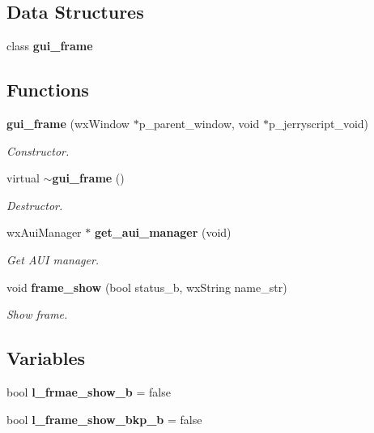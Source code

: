 \subsection*{Data Structures}
\begin{DoxyCompactItemize}
\item 
class \textbf{ gui\+\_\+frame}
\end{DoxyCompactItemize}
\subsection*{Functions}
\begin{DoxyCompactItemize}
\item 
\textbf{ gui\+\_\+frame} (wx\+Window $\ast$p\+\_\+parent\+\_\+window, void $\ast$p\+\_\+jerryscript\+\_\+void)
\begin{DoxyCompactList}\small\item\em Constructor. \end{DoxyCompactList}\item 
virtual \textbf{ $\sim$gui\+\_\+frame} ()
\begin{DoxyCompactList}\small\item\em Destructor. \end{DoxyCompactList}\item 
wx\+Aui\+Manager $\ast$ \textbf{ get\+\_\+aui\+\_\+manager} (void)
\begin{DoxyCompactList}\small\item\em Get A\+UI manager. \end{DoxyCompactList}\item 
void \textbf{ frame\+\_\+show} (bool status\+\_\+b, wx\+String name\+\_\+str)
\begin{DoxyCompactList}\small\item\em Show frame. \end{DoxyCompactList}\end{DoxyCompactItemize}
\subsection*{Variables}
\begin{DoxyCompactItemize}
\item 
bool \textbf{ l\+\_\+frmae\+\_\+show\+\_\+b} = false
\item 
\mbox{\label{group___g_u_i_ga3cc19a2072731606e8ffd6e87a18e4ce}} 
bool {\bfseries l\+\_\+frame\+\_\+show\+\_\+bkp\+\_\+b} = false
\end{DoxyCompactItemize}


